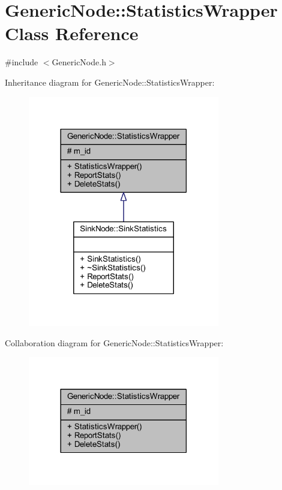 \hypertarget{class_generic_node_1_1_statistics_wrapper}{}\section{Generic\+Node\+:\+:Statistics\+Wrapper Class Reference}
\label{class_generic_node_1_1_statistics_wrapper}


{\ttfamily \#include $<$Generic\+Node.\+h$>$}



Inheritance diagram for Generic\+Node\+:\+:Statistics\+Wrapper\+:
\nopagebreak
\begin{figure}[H]
\begin{center}
\leavevmode
\includegraphics[width=237pt]{class_generic_node_1_1_statistics_wrapper__inherit__graph}
\end{center}
\end{figure}


Collaboration diagram for Generic\+Node\+:\+:Statistics\+Wrapper\+:
\nopagebreak
\begin{figure}[H]
\begin{center}
\leavevmode
\includegraphics[width=237pt]{class_generic_node_1_1_statistics_wrapper__coll__graph}
\end{center}
\end{figure}
